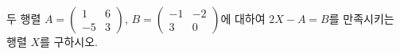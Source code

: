 \hspace*{2mm}\begin{minipage}[t]{\dimexpr\linewidth-2mm\relax}\vspace{0pt}
두 행렬 $A=\begin{pmatrix} 1 & 6 \\ -5 & 3 \end{pmatrix}$, $B=\begin{pmatrix} -1 & -2 \\ 3 & 0 \end{pmatrix}$에 대하여 $2X-A=B$를 만족시키는 행렬 $X$를 구하시오.\end{minipage}
